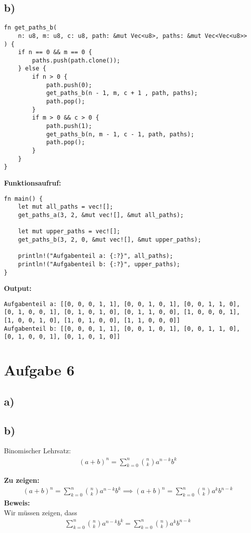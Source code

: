 \documentclass[a4paper]{scrartcl}
\begin{document}
\subsection*{b)}
\begin{lstlisting}
fn get_paths_b(
    n: u8, m: u8, c: u8, path: &mut Vec<u8>, paths: &mut Vec<Vec<u8>>
) {
    if n == 0 && m == 0 {
        paths.push(path.clone());
    } else {
        if n > 0 {
            path.push(0);
            get_paths_b(n - 1, m, c + 1 , path, paths);
            path.pop();
        }
        if m > 0 && c > 0 {
            path.push(1);
            get_paths_b(n, m - 1, c - 1, path, paths);
            path.pop();
        }
    }
}
\end{lstlisting}    
\textbf{Funktionsaufruf:}
\begin{lstlisting}
fn main() {
    let mut all_paths = vec![];
    get_paths_a(3, 2, &mut vec![], &mut all_paths);

    let mut upper_paths = vec![];
    get_paths_b(3, 2, 0, &mut vec![], &mut upper_paths);

    println!("Aufgabenteil a: {:?}", all_paths);
    println!("Aufgabenteil b: {:?}", upper_paths);
}
\end{lstlisting}

\textbf{Output:}
\begin{lstlisting}
Aufgabenteil a: [[0, 0, 0, 1, 1], [0, 0, 1, 0, 1], [0, 0, 1, 1, 0], 
[0, 1, 0, 0, 1], [0, 1, 0, 1, 0], [0, 1, 1, 0, 0], [1, 0, 0, 0, 1], 
[1, 0, 0, 1, 0], [1, 0, 1, 0, 0], [1, 1, 0, 0, 0]]
Aufgabenteil b: [[0, 0, 0, 1, 1], [0, 0, 1, 0, 1], [0, 0, 1, 1, 0], 
[0, 1, 0, 0, 1], [0, 1, 0, 1, 0]]
\end{lstlisting}

\newpage
\section*{Aufgabe 6}
\subsection*{a)}

\subsection*{b)}
Binomischer Lehrsatz:
\begin{align*}
    (a + b)^n = \sum_{k=0}^{n} \binom{n}{k} a^{n-k} b^k
\end{align*}

\textbf{Zu zeigen:}
\begin{align*}
    (a + b)^n = \sum_{k=0}^{n} \binom{n}{k} a^{n-k} b^k \implies (a + b)^n = \sum_{k=0}^{n} \binom{n}{k} a^{k} b^{n-k}
\end{align*}
\textbf{Beweis:} \\
Wir müssen zeigen, dass
\begin{align*}
    \sum_{k=0}^{n} \binom{n}{k} a^{n-k} b^k = \sum_{k=0}^{n} \binom{n}{k} a^k b^{n-k}
\end{align*}
\end{document}
